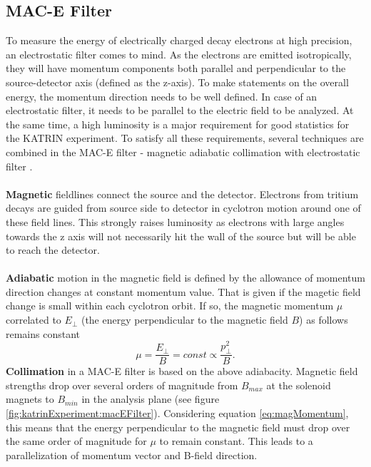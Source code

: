        \subsection{MAC-E Filter}
      \label{ch:The KATRIN experiment:sec:MAC-E}
		To measure the energy of electrically charged decay electrons at high precision, an electrostatic filter comes to mind. As the electrons are emitted isotropically, they will have momentum components both parallel and perpendicular to the source-detector axis (defined as the z-axis). To make statements on the overall energy, the momentum direction needs to be well defined. In case of an electrostatic filter, it needs to be parallel to the electric field to be analyzed.
		At the same time, a high luminosity is a major requirement for good statistics for the KATRIN experiment.
		To satisfy all these requirements, several techniques are combined in the MAC-E filter - magnetic adiabatic collimation with electrostatic filter \cite{katrinPrinciple}.\\\\
		{\bf Magnetic} fieldlines connect the source and the detector. Electrons from tritium decays are guided from source side to detector in cyclotron motion around one of these field lines. This strongly raises luminosity as electrons with large angles towards the z axis will not necessarily hit the wall of the source but will be able to reach the detector.\\\\
		{\bf Adiabatic} motion in the magnetic field is defined by the allowance of momentum direction changes at constant momentum value. That is given if the magetic field change is small within each cyclotron orbit. If so, the magnetic momentum $\mu$ correlated to $E_\bot$ (the energy perpendicular to the magnetic field $B$) as follows remains constant
		\begin{equation}
			\mu = \frac{E_{\bot}}{B} = const \propto \frac{p^2_\bot}{B}.
			\label{eq:magMomentum}
		\end{equation}
		{\bf Collimation} in a MAC-E filter is based on the above adiabacity. Magnetic field strengths drop over several orders of magnitude from $B_{max}$ at the solenoid magnets to $B_{min}$ in the analysis plane (see figure \ref{fig:katrinExperiment:macEFilter}). Considering equation \ref{eq:magMomentum}, this means that the energy perpendicular to the magnetic field must drop over the same order of magnitude for $\mu$ to remain constant. This leads to a parallelization of momentum vector and B-field direction. \\\\
